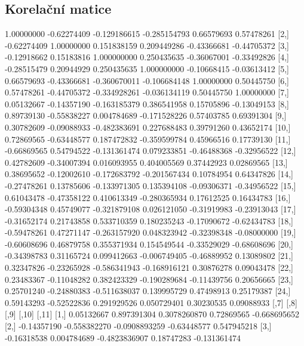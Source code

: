 \documentclass[a4paper, 12pt]{article}
\begin{document}
\subsection{Korelační matice}
\begin{table}[H]
\small
\begin{Schunk}
\begin{Soutput}
             [,1]        [,2]         [,3]         [,4]        [,5]        [,6]
 [1,]  1.00000000 -0.62274409 -0.129186615 -0.285154793  0.66579693  0.57478261
 [2,] -0.62274409  1.00000000  0.151838159  0.209449286 -0.43366681 -0.44705372
 [3,] -0.12918662  0.15183816  1.000000000  0.250435635 -0.36067001 -0.33492826
 [4,] -0.28515479  0.20944929  0.250435635  1.000000000 -0.10668415 -0.03613412
 [5,]  0.66579693 -0.43366681 -0.360670011 -0.106684148  1.00000000  0.50445750
 [6,]  0.57478261 -0.44705372 -0.334928261 -0.036134119  0.50445750  1.00000000
 [7,]  0.05132667 -0.14357190 -0.163185379  0.386541958  0.15705896 -0.13049153
 [8,]  0.89739130 -0.55838227  0.004784689 -0.171528226  0.57403785  0.69391304
 [9,]  0.30782609 -0.09088933 -0.482383691  0.227688483  0.39791260  0.43652174
[10,]  0.72869565 -0.63448577  0.187472832 -0.359599784  0.45966516  0.17739130
[11,] -0.66869565  0.54794522 -0.131361474  0.079233851 -0.46488368 -0.32956522
[12,]  0.42782609 -0.34007394  0.016093955  0.404005569  0.37442923  0.02869565
[13,]  0.38695652 -0.12002610 -0.172683792 -0.201567434  0.10784954  0.64347826
[14,] -0.27478261  0.13785606 -0.133971305  0.135394108 -0.09306371 -0.34956522
[15,]  0.61043478 -0.47358122  0.410613349 -0.280365934  0.17612525  0.16434783
[16,] -0.59304348  0.45749077 -0.321879108  0.026121050 -0.31919983 -0.23913043
[17,] -0.31652174  0.21743858  0.533710359  0.180235243 -0.17090672 -0.62434783
[18,] -0.59478261  0.47271147 -0.263157920  0.048323942 -0.32398348 -0.08000000
[19,] -0.60608696  0.46879758  0.355371934  0.154549544 -0.33529029 -0.68608696
[20,] -0.34398783  0.31165724  0.099412663 -0.006749405 -0.46889952  0.13089802
[21,]  0.32347826 -0.23265928 -0.586341943 -0.168916121  0.30876278  0.09043478
[22,]  0.23483367 -0.11048282  0.382423329 -0.190289684 -0.11439756  0.20656665
[23,]  0.25701240 -0.24880383 -0.511638037  0.139995729  0.47498913  0.25179387
[24,]  0.59143293 -0.52522836  0.291929526  0.050729401  0.30230535  0.09088933
             [,7]         [,8]          [,9]       [,10]        [,11]
 [1,]  0.05132667  0.897391304  0.3078260870  0.72869565 -0.668695652
 [2,] -0.14357190 -0.558382270 -0.0908893259 -0.63448577  0.547945218
 [3,] -0.16318538  0.004784689 -0.4823836907  0.18747283 -0.131361474

\end{Soutput}
\end{Schunk}
\end{table}
\end{document}
